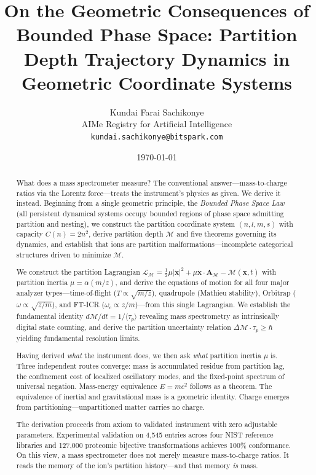 \documentclass[twocolumn,10pt,a4paper]{article}
\theoremstyle{definition}
\theoremstyle{remark}
\newcommand{\Depth}{\mathcal{M}}
\newcommand{\Lagr}{\mathcal{L}}
\newcommand{\Apartition}{\mathbf{A}_{\mathcal{M}}}
\newcommand{\partinert}{\mu}
\newcommand{\taup}{\tau_p}
\begin{document}
\title{\textbf{On the Geometric Consequences of Bounded Phase Space: Partition Depth Trajectory Dynamics in Geometric Coordinate Systems}}

\author{
Kundai Farai Sachikonye\\
AIMe Registry for Artificial Intelligence\\
\texttt{kundai.sachikonye@bitspark.com}
}

\date{\today}

\maketitle

\begin{abstract}
\noindent What does a mass spectrometer measure? The conventional answer---mass-to-charge ratios via the Lorentz force---treats the instrument's physics as given. We derive it instead. Beginning from a single geometric principle, the \emph{Bounded Phase Space Law} (all persistent dynamical systems occupy bounded regions of phase space admitting partition and nesting), we construct the partition coordinate system $(n, l, m, s)$ with capacity $C(n) = 2n^2$, derive partition depth $\Depth$ and five theorems governing its dynamics, and establish that ions are partition malformations---incomplete categorical structures driven to minimize $\Depth$.

We construct the partition Lagrangian $\Lagr_{\Depth} = \frac{1}{2}\partinert|\dot{\mathbf{x}}|^2 + \partinert\dot{\mathbf{x}}\cdot\Apartition - \Depth(\mathbf{x}, t)$ with partition inertia $\partinert = \alpha(m/z)$, and derive the equations of motion for all four major analyzer types---time-of-flight ($T \propto \sqrt{m/z}$), quadrupole (Mathieu stability), Orbitrap ($\omega \propto \sqrt{z/m}$), and FT-ICR ($\omega_c \propto z/m$)---from this single Lagrangian. We establish the fundamental identity $d\Depth/dt = 1/\langle\taup\rangle$ revealing mass spectrometry as intrinsically digital state counting, and derive the partition uncertainty relation $\Delta\Depth \cdot \taup \geq \hbar$ yielding fundamental resolution limits.

Having derived \emph{what} the instrument does, we then ask \emph{what} partition inertia $\partinert$ is. Three independent routes converge: mass is accumulated residue from partition lag, the confinement cost of localized oscillatory modes, and the fixed-point spectrum of universal negation. Mass-energy equivalence $E = mc^2$ follows as a theorem. The equivalence of inertial and gravitational mass is a geometric identity. Charge emerges from partitioning---unpartitioned matter carries no charge.

The derivation proceeds from axiom to validated instrument with zero adjustable parameters. Experimental validation on 4,545 entries across four NIST reference libraries and 127,000 proteomic bijective transformations achieves 100\% conformance. On this view, a mass spectrometer does not merely measure mass-to-charge ratios. It reads the memory of the ion's partition history---and that memory \emph{is} mass.
\end{abstract}
\end{document}
